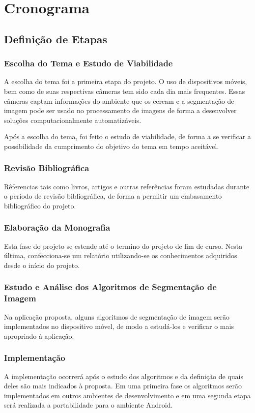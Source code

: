 \chapter{Cronograma}
\section{Definição de Etapas}
\subsection{Escolha do Tema e Estudo de Viabilidade}
A escolha do tema foi a primeira etapa do projeto. O uso de dispositivos móveis, bem como de suas respectivas câmeras tem sido cada dia mais frequentes. Essas câmeras captam informações do ambiente que os cercam e a segmentação de imagem pode ser usado no processamento de imagens de forma a desenvolver soluções computacionalmente automatizáveis.

Após a escolha do tema, foi feito o estudo de viabilidade, de forma a se verificar a possibilidade da cumprimento do objetivo do tema em tempo aceitável.

\subsection{Revisão Bibliográfica}
Rêferencias tais como livros, artigos e outras referências foram estudadas durante o período de revisão bibliográfica, de forma a permitir um embasamento bibliográfico do projeto.

\subsection{Elaboração da Monografia}
Esta fase do projeto se estende até o termino do projeto de fim de curso. Nesta última, confecciona-se um relatório utilizando-se os conhecimentos adquiridos desde o início do projeto.

\subsection{Estudo e Análise dos Algoritmos de Segmentação de Imagem}
Na aplicação proposta, alguns algoritmos de segmentação de imagem serão implementados no dispositivo móvel, de modo a estudá-los e verificar o mais apropriado à aplicação.

\subsection{Implementação}
A implementação ocorrerá após o estudo dos algoritmos e da definição de quais deles são mais indicados à proposta. Em uma primeira fase os algoritmos serão implementados em outros ambientes de desenvolvimento e em uma segunda etapa será realizada a portabilidade para o ambiente Android.


